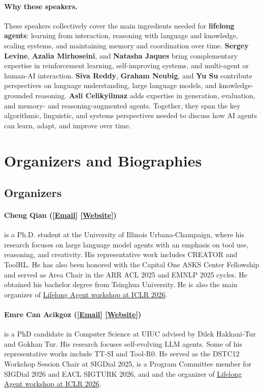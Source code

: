 \paragraph{Why these speakers.}
These speakers collectively cover the main ingredients needed for \textbf{lifelong agents}: learning from interaction, reasoning with language and knowledge, scaling systems, and maintaining memory and coordination over time. \textbf{Sergey Levine}, \textbf{Azalia Mirhoseini}, and \textbf{Natasha Jaques} bring complementary expertise in reinforcement learning, self-improving systems, and multi-agent or human-AI interaction. \textbf{Siva Reddy}, \textbf{Graham Neubig}, and \textbf{Yu Su} contribute perspectives on language understanding, large language models, and knowledge-grounded reasoning. \textbf{Asli Celikyilmaz} adds expertise in generation, evaluation, and memory- and reasoning-augmented agents. Together, they span the key algorithmic, linguistic, and systems perspectives needed to discuss how AI agents can learn, adapt, and improve over time.


\section{Organizers and Biographies}
\subsection{Organizers}

\paragraph{Cheng Qian ([\href{mailto:chengq9@illinois.edu}{Email}] [\href{https://qiancheng0.github.io/}{Website}])}
is a Ph.D. student at the University of Illinois Urbana-Champaign, where his research focuses on large language model agents with an emphasis on tool use, reasoning, and creativity. His representative work includes CREATOR and ToolRL. He has also been honored with the Capital One ASKS Center Fellowship and served as Area Chair in the ARR ACL 2025 and EMNLP 2025 cycles. He obtained his bachelor degree from Tsinghua University. He is also the main organizer of \href{https://lifelongagent.github.io/}{Lifelong Agent workshop at ICLR 2026}.

\paragraph{Emre Can Acikgoz ([\href{mailto:acikgoz2@illinois.edu}{Email}] [\href{https://emrecanacikgoz.github.io/}{Website}])}
is a PhD candidate in Computer Science at UIUC advised by Dilek Hakkani-Tur and Gokhan Tur. His research focuses self-evolving LLM agents. Some of his representative works include TT-SI and Tool-R0. He served as the DSTC12 Workshop Session Chair at SIGDial 2025, is a Program Committee member for SIGDial 2026 and EACL SIGTURK 2026, and and the organizer of \href{https://lifelongagent.github.io/}{Lifelong Agent workshop at ICLR 2026}.

